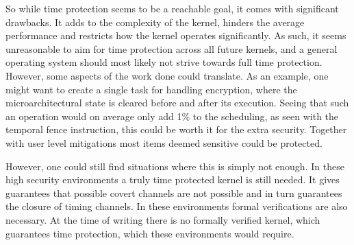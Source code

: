 So while time protection seems to be a reachable goal, it comes with
significant drawbacks. It adds to the complexity of the kernel, hinders the
average performance and restricts how the kernel operates significantly. As
such, it seems unreasonable to aim for time protection across all future
kernels, and a general operating system should most likely not strive towards
full time protection. However, some aspects of the work done could translate.
As an example, one might want to create a single task for handling encryption,
where the microarchitectural state is cleared before and after its execution.
Seeing that such an operation would on average only add 1\% to the scheduling,
as seen with the temporal fence instruction, this could be worth it for the
extra security. Together with user level mitigations most items deemed
sensitive could be protected.

However, one could still find situations where this is simply not enough. In
these high security environments a truly time protected kernel is still needed.
It gives guarantees that possible covert channels are not possible and in turn
guarantees the closure of timing channels. In these environments formal
verifications are also necessary. At the time of writing there is no formally
verified kernel, which guarantees time protection, which these environments
would require. 

